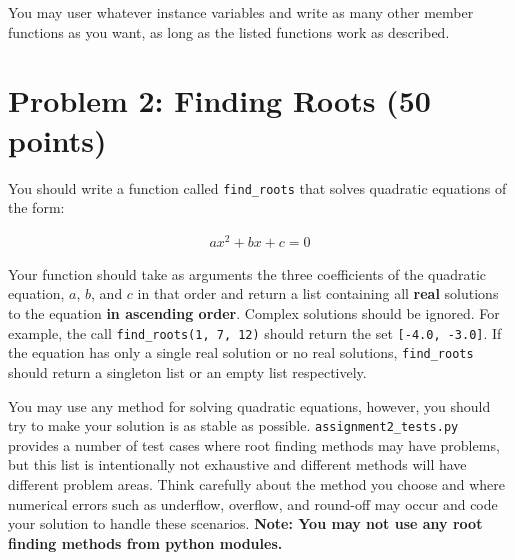 \documentclass[11pt]{article} %
\begin{document}
You may user whatever instance variables and write as many other member functions as you want, as long as the listed functions work as described.

\section*{Problem 2: Finding Roots (50 points)}
You should write a function called \verb|find_roots| that solves quadratic equations of the form:

\begin{align}
	ax^2 + bx + c = 0
\end{align}

Your function should take as arguments the three coefficients of the quadratic equation, $a$, $b$, and $c$ in that order and return a list containing all \textbf{real} solutions to the equation \textbf{in ascending order}. Complex solutions should be ignored. For example, the call \verb|find_roots(1, 7, 12)| should return the set \verb|[-4.0, -3.0]|. If the equation has only a single real solution or no real solutions, \verb|find_roots| should return a singleton list or an empty list respectively.

You may use any method for solving quadratic equations, however, you should try to make your solution is as stable as possible. \verb|assignment2_tests.py| provides a number of test cases where root finding methods may have problems, but this list is intentionally not exhaustive and different methods will have different problem areas. Think carefully about the method you choose and where numerical errors such as underflow, overflow, and round-off may occur and code your solution to handle these scenarios. \textbf{Note: You may not use any root finding methods from python modules.} 
\end{document}
